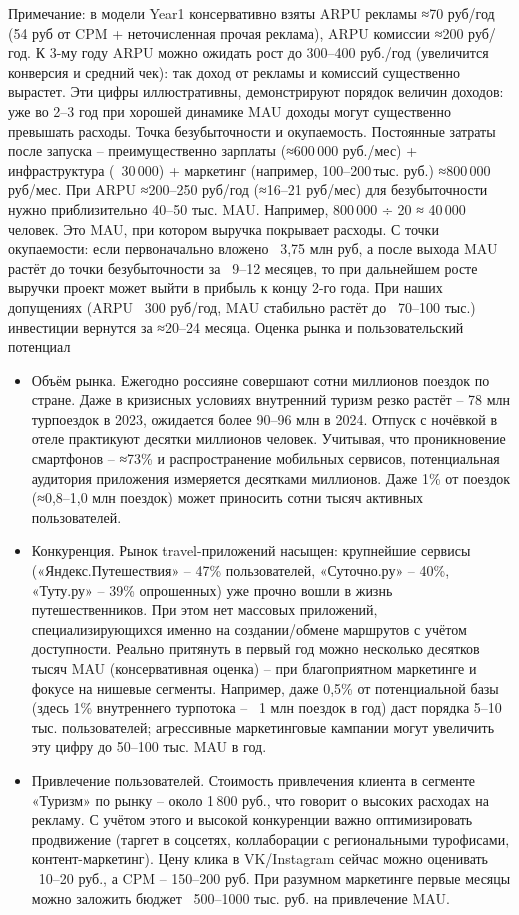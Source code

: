 Примечание: в модели Year1 консервативно взяты ARPU рекламы ≈70 руб/год (54 руб от CPM + неточисленная прочая реклама), ARPU комиссии ≈200 руб/год. К 3-му году ARPU можно ожидать рост до 300–400 руб./год (увеличится конверсия и средний чек): так доход от рекламы и комиссий существенно вырастет. Эти цифры иллюстративны, демонстрируют порядок величин доходов: уже во 2–3 год при хорошей динамике MAU доходы могут существенно превышать расходы.
Точка безубыточности и окупаемость. Постоянные затраты после запуска – преимущественно зарплаты (≈600 000 руб./мес) + инфраструктура (~30 000) + маркетинг (например, 100–200 тыс. руб.) ≈800 000 руб/мес. При ARPU ≈200–250 руб/год (≈16–21 руб/мес) для безубыточности нужно приблизительно 40–50 тыс. MAU. Например, 800 000 ÷ 20 ≈ 40 000 человек. Это MAU, при котором выручка покрывает расходы. С точки окупаемости: если первоначально вложено ~3,75 млн руб, а после выхода MAU растёт до точки безубыточности за ~9–12 месяцев, то при дальнейшем росте выручки проект может выйти в прибыль к концу 2-го года. При наших допущениях (ARPU ~300 руб/год, MAU стабильно растёт до ~70–100 тыс.) инвестиции вернутся за ≈20–24 месяца.
Оценка рынка и пользовательский потенциал
\begin{itemize}
    \item Объём рынка. Ежегодно россияне совершают сотни миллионов поездок по стране. Даже в кризисных условиях внутренний туризм резко растёт – 78 млн турпоездок в 2023, ожидается более 90–96 млн в 2024. Отпуск с ночёвкой в отеле практикуют десятки миллионов человек. Учитывая, что проникновение смартфонов – ≈73\% и распространение мобильных сервисов, потенциальная аудитория приложения измеряется десятками миллионов. Даже 1\% от поездок (≈0,8–1,0 млн поездок) может приносить сотни тысяч активных пользователей.
    \item Конкуренция. Рынок travel-приложений насыщен: крупнейшие сервисы («Яндекс.Путешествия» – 47\% пользователей, «Суточно.ру» – 40\%, «Туту.ру» – 39\% опрошенных) уже прочно вошли в жизнь путешественников. При этом нет массовых приложений, специализирующихся именно на создании/обмене маршрутов с учётом доступности. Реально притянуть в первый год можно несколько десятков тысяч MAU (консервативная оценка) – при благоприятном маркетинге и фокусе на нишевые сегменты. Например, даже 0,5\% от потенциальной базы (здесь 1\% внутреннего турпотока – ~1 млн поездок в год) даст порядка 5–10 тыс. пользователей; агрессивные маркетинговые кампании могут увеличить эту цифру до 50–100 тыс. MAU в год.
    \item Привлечение пользователей. Стоимость привлечения клиента в сегменте «Туризм» по рынку – около 1 800 руб., что говорит о высоких расходах на рекламу. С учётом этого и высокой конкуренции важно оптимизировать продвижение (таргет в соцсетях, коллаборации с региональными турофисами, контент-маркетинг). Цену клика в VK/Instagram сейчас можно оценивать ~10–20 руб., а CPM – 150–200 руб. При разумном маркетинге первые месяцы можно заложить бюджет ~500–1000 тыс. руб. на привлечение MAU.
\end{itemize}
